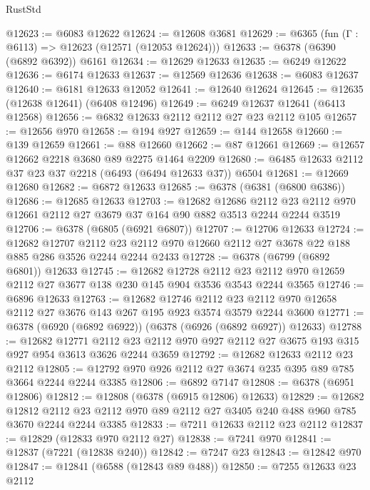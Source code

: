 \begin{lexlean}{RustStd}
\begin{coremodule}
@12623 := @6083 @12622
@12624 := @12608 @3681
@12629 := @6365 (fun (Γ : @6113) => @12623 (@12571 (@12053 @12624)))
@12633 := @6378 (@6390 (@6892 @6392)) @6161
@12634 := @12629 @12633
@12635 := @6249 @12622
@12636 := @6174 @12633
@12637 := @12569 @12636
@12638 := @6083 @12637
@12640 := @6181 @12633 @12052
@12641 := @12640 @12624
@12645 := @12635 (@12638 @12641) (@6408 @12496)
@12649 := @6249 @12637 @12641 (@6413 @12568)
@12656 := @6832 @12633 @2112 @2112 @27 @23 @2112 @105
@12657 := @12656 @970
@12658 := @194 @927
@12659 := @144 @12658
@12660 := @139 @12659
@12661 := @88 @12660
@12662 := @87 @12661
@12669 := @12657 @12662 @2218 @3680 @89 @2275 @1464 @2209
@12680 := @6485 @12633 @2112 @37 @23 @37 @2218 (@6493 (@6494 @12633 @37)) @6504
@12681 := @12669 @12680
@12682 := @6872 @12633
@12685 := @6378 (@6381 (@6800 @6386))
@12686 := @12685 @12633
@12703 := @12682
    @12686
    @2112
    @23
    @2112
    @970
    @12661
    @2112
    @27
    @3679
    @37
    @164
    @90
    @882
    @3513
    @2244
    @2244
    @3519
@12706 := @6378 (@6805 (@6921 @6807))
@12707 := @12706 @12633
@12724 := @12682
    @12707
    @2112
    @23
    @2112
    @970
    @12660
    @2112
    @27
    @3678
    @22
    @188
    @885
    @286
    @3526
    @2244
    @2244
    @2433
@12728 := @6378 (@6799 (@6892 @6801)) @12633
@12745 := @12682
    @12728
    @2112
    @23
    @2112
    @970
    @12659
    @2112
    @27
    @3677
    @138
    @230
    @145
    @904
    @3536
    @3543
    @2244
    @3565
@12746 := @6896 @12633
@12763 := @12682
    @12746
    @2112
    @23
    @2112
    @970
    @12658
    @2112
    @27
    @3676
    @143
    @267
    @195
    @923
    @3574
    @3579
    @2244
    @3600
@12771 := @6378 (@6920 (@6892 @6922)) (@6378 (@6926 (@6892 @6927)) @12633)
@12788 := @12682
    @12771
    @2112
    @23
    @2112
    @970
    @927
    @2112
    @27
    @3675
    @193
    @315
    @927
    @954
    @3613
    @3626
    @2244
    @3659
@12792 := @12682 @12633 @2112 @23 @2112
@12805 := @12792 @970 @926 @2112 @27 @3674 @235 @395 @89 @785 @3664 @2244 @2244 @3385
@12806 := @6892 @7147
@12808 := @6378 (@6951 @12806)
@12812 := @12808 (@6378 (@6915 @12806) @12633)
@12829 := @12682
    @12812
    @2112
    @23
    @2112
    @970
    @89
    @2112
    @27
    @3405
    @240
    @488
    @960
    @785
    @3670
    @2244
    @2244
    @3385
@12833 := @7211 @12633 @2112 @23 @2112
@12837 := @12829 (@12833 @970 @2112 @27)
@12838 := @7241 @970
@12841 := @12837 (@7221 (@12838 @240))
@12842 := @7247 @23
@12843 := @12842 @970
@12847 := @12841 (@6588 (@12843 @89 @488))
@12850 := @7255 @12633 @23 @2112

\end{coremodule}
\end{lexlean}
